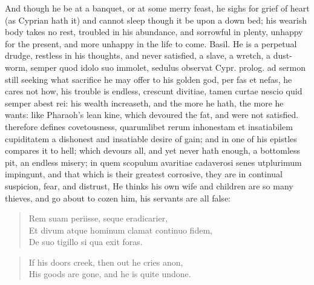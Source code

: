 {{And though he be at a banquet, or at some merry feast, he sighs for
grief of heart (as Cyprian hath it) and cannot sleep though it be
upon a down bed; his wearish body takes no rest, troubled in his
abundance, and sorrowful in plenty, unhappy for the present, and more
unhappy in the life to come. Basil. He is a perpetual drudge,
restless in his thoughts, and never satisfied, a slave, a wretch,
a dust-worm, semper quod idolo suo immolet, sedulus observat Cypr.
prolog. ad sermon still seeking what sacrifice he may offer to his
golden god, per fas et nefas, he cares not how, his trouble is endless,
crescunt divitiae, tamen curtae nescio quid semper abest rei: his
wealth increaseth, and the more he hath, the more he wants: like
Pharaoh's lean kine, which devoured the fat, and were not satisfied.
\Austin{} therefore defines covetousness, quarumlibet rerum
inhonestam et insatiabilem cupiditatem a dishonest and insatiable
desire of gain; and in one of his epistles compares it to hell;
which devours all, and yet never hath enough, a bottomless pit,
an endless misery; in quem scopulum avaritiae cadaverosi senes
utplurimum impingunt, and that which is their greatest corrosive, they
are in continual suspicion, fear, and distrust, He thinks his own wife
and children are so many thieves, and go about to cozen him, his
servants are all false:
%
\begin{verse}
\textlatin{Rem suam periisse, seque eradicarier},\\
\textlatin{Et divum atque hominum clamat continuo fidem},\\
\textlatin{De suo tigillo si qua exit foras}.
\end{verse}
\translationrule
\begin{verse}
If his doors creek, then out he cries anon,\\
His goods are gone, and he is quite undone.
\end{verse}

}}
